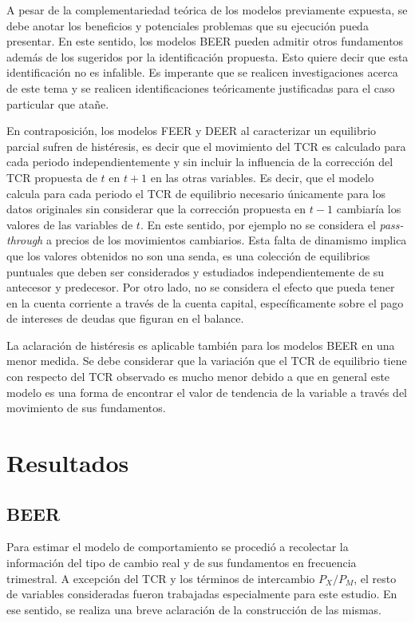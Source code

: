\documentclass[12pt,letterpaper]{article}
\begin{document}
A pesar de la complementariedad teórica de los modelos previamente expuesta, se debe anotar los beneficios y potenciales problemas que su ejecución pueda presentar. En este sentido, los modelos BEER pueden admitir otros fundamentos además de los sugeridos por la identificación propuesta. Esto quiere decir que esta identificación no es infalible. Es imperante que se realicen investigaciones acerca de este tema y se realicen identificaciones teóricamente justificadas para el caso particular que atañe. 

En contraposición, los modelos FEER  y DEER al caracterizar un equilibrio parcial sufren de histéresis, es decir que el movimiento del TCR es calculado para cada periodo independientemente y sin incluir la influencia de la corrección del TCR propuesta de $t$ en $t+1$ en las otras variables. Es decir, que el modelo calcula para cada periodo el TCR de equilibrio necesario únicamente para los datos originales sin considerar que la corrección propuesta en $t-1$ cambiaría los valores de las variables de $t$. En este sentido, por ejemplo no se considera el \emph{pass-through} a precios de los movimientos cambiarios. Esta falta de dinamismo implica que los valores obtenidos no son una senda, es una colección de equilibrios puntuales que deben ser considerados y estudiados independientemente de su antecesor y predecesor. Por otro lado, no se considera el efecto que pueda tener en la cuenta corriente a través de la cuenta capital, específicamente sobre el pago de intereses de deudas que figuran en el balance.

La aclaración de histéresis es aplicable también para los modelos BEER en una menor medida. Se debe considerar que la variación que el TCR de equilibrio tiene con respecto del TCR observado es mucho menor debido a que en general este modelo es una forma de encontrar el valor de tendencia de la variable a través del movimiento de sus fundamentos.

\section{Resultados}\label{calc}

\subsection*{BEER}
Para estimar el modelo de comportamiento se procedió a recolectar la información del tipo de cambio real y de sus fundamentos en frecuencia trimestral. A excepción del TCR y los términos de intercambio $P_X/P_M$, el resto de variables consideradas fueron trabajadas especialmente para este estudio. En ese sentido, se realiza una breve aclaración de la construcción de las mismas. 
\end{document}
